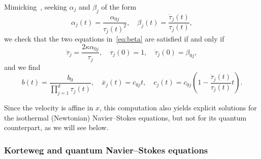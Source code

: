 Mimicking~\cite{LiWa06}, seeking $\alpha_j$ and $\beta_j$ of the form
\begin{equation*}
\alpha_j(t) =\frac{\alpha_{0j}}{\tau_j(t)^2},\quad \beta_j(t) =
\frac{\dot \tau_j(t)}{\tau_j(t)},
\end{equation*}
we check that the two equations in~\eqref{eq:beta} are satisfied if and only if
\begin{equation}\label{eq:tauj}
\ddot \tau_j =
\frac{2\kappa \alpha_{0j}}{\tau_j},\quad
\tau_j(0)=1,\quad \dot \tau_j(0)=\beta_{0j},
\end{equation}
and we find
\begin{equation*}
b(t)=\frac{b_0}{\prod_{j=1}^d \tau_j(t)},\quad
\overline x_j(t)= c_{0j}t,\quad c_j(t) =c_{0j}\left(1-\frac{\dot
\tau_j(t)}{\tau_j(t)}t\right).
\end{equation*}
\begin{rema}
Since the velocity is affine in $x$, this computation also yields explicit solutions for the isothermal (Newtonian) Navier--Stokes equations, but not for its quantum counterpart, as we will see below.
\end{rema}

\subsubsection{Korteweg and quantum Navier--Stokes equations}

